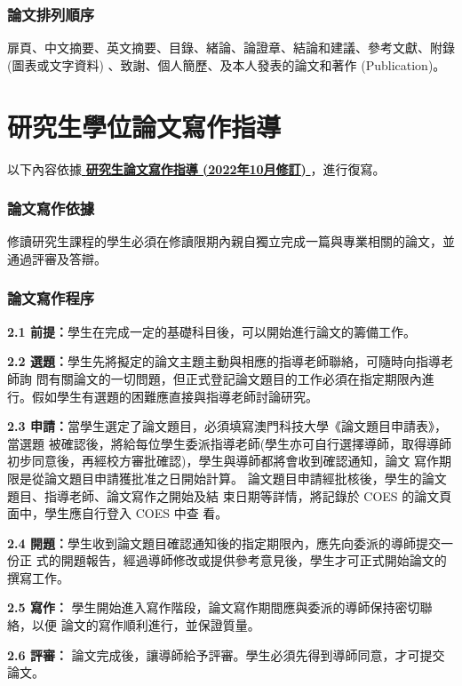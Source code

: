 \documentclass[
    writingLanguage=chinese, %
    addPageTitle=on,  %
    addDeclaration=on, %
    addMUSTlog=off, %
    addFigTOC=on, %
    addTabTOC=on, %
    refIndent=off, %
    printMod=off, %
]{.def/must}
\begin{document}
\addinfo
\subsection{論文排列順序}
扉頁、中文摘要、英文摘要、目錄、緒論、論證章、結論和建議、參考文獻、附錄
(圖表或文字資料) 、致謝、個人簡歷、及本人發表的論文和著作 (Publication)。






\chapter{研究生學位論文寫作指導}
\noindent 以下內容依據\href{https://www.must.edu.mo/images/GSO/files/sgsdocument/GS002.pdf}{\textbf{ 研究生論文寫作指導 (2022年10月修訂) }}，進行復寫。

\subsection{論文寫作依據}
修讀研究生課程的學生必須在修讀限期內親自獨立完成一篇與專業相關的論文，並通過評審及答辯。
\subsection{論文寫作程序}

\noindent \textbf{2.1 前提：}學生在完成一定的基礎科目後，可以開始進行論文的籌備工作。

\noindent \textbf{2.2 選題：}學生先將擬定的論文主題主動與相應的指導老師聯絡，可隨時向指導老師詢
問有關論文的一切問題，但正式登記論文題目的工作必須在指定期限內進
行。假如學生有選題的困難應直接與指導老師討論研究。

\noindent \textbf{2.3 申請：}當學生選定了論文題目，必須填寫澳門科技大學《論文題目申請表》，當選題
被確認後，將給每位學生委派指導老師(學生亦可自行選擇導師，取得導師
初步同意後，再經校方審批確認)，學生與導師都將會收到確認通知，論文
寫作期限是從論文題目申請獲批准之日開始計算。
 論文題目申請經批核後，學生的論文題目、指導老師、論文寫作之開始及結
束日期等詳情，將記錄於 COES 的論文頁面中，學生應自行登入 COES 中查
看。

\noindent \textbf{2.4 開題：}學生收到論文題目確認通知後的指定期限內，應先向委派的導師提交一份正
式的開題報告，經過導師修改或提供參考意見後，學生才可正式開始論文的
撰寫工作。

\noindent \textbf{2.5 寫作：} 學生開始進入寫作階段，論文寫作期間應與委派的導師保持密切聯絡，以便
論文的寫作順利進行，並保證質量。

\noindent \textbf{2.6 評審：} 論文完成後，讓導師給予評審。學生必須先得到導師同意，才可提交論文。
\end{document}
